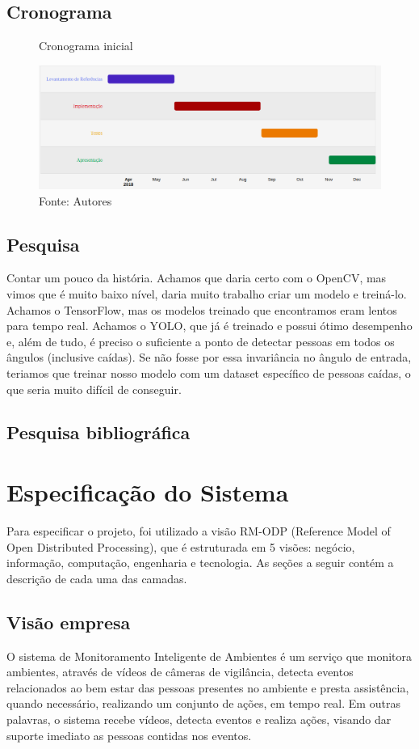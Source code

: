 \documentclass[]{politex}
\begin{document}
\section{Cronograma}

\begin{figure}[H]
    \centering
    \caption{Cronograma inicial}
    \includegraphics[width=\textwidth]{metodologia_gantt}
    \caption*{Fonte: Autores}
    \label{fig:cronograma}
\end{figure}

\section{Pesquisa}
Contar um pouco da história. Achamos que daria certo com o OpenCV, mas vimos que é muito baixo nível, daria muito trabalho criar um modelo e treiná-lo. Achamos o TensorFlow, mas os modelos treinado que encontramos eram lentos para tempo real. Achamos o YOLO, que já é treinado e possui ótimo desempenho e, além de tudo, é preciso o suficiente a ponto de detectar pessoas em todos os ângulos (inclusive caídas). Se não fosse por essa invariância no ângulo de entrada, teriamos que treinar nosso modelo com um dataset específico de pessoas caídas, o que seria muito difícil de conseguir.

\section{Pesquisa bibliográfica}


\chapter{Especificação do Sistema}
Para especificar o projeto, foi utilizado a visão RM-ODP (Reference Model of Open Distributed Processing), que é estruturada em 5 visões: negócio, informação, computação, engenharia e tecnologia. As seções a seguir contém a descrição de cada uma das camadas.

\section{Visão empresa}
O sistema de Monitoramento Inteligente de Ambientes é um serviço que monitora ambientes, através de vídeos de câmeras de vigilância, detecta eventos relacionados ao bem estar das pessoas presentes no ambiente e presta assistência, quando necessário, realizando um conjunto de ações, em tempo real. Em outras palavras, o sistema recebe vídeos, detecta eventos e realiza ações, visando dar suporte imediato as pessoas contidas nos eventos.
\end{document}
